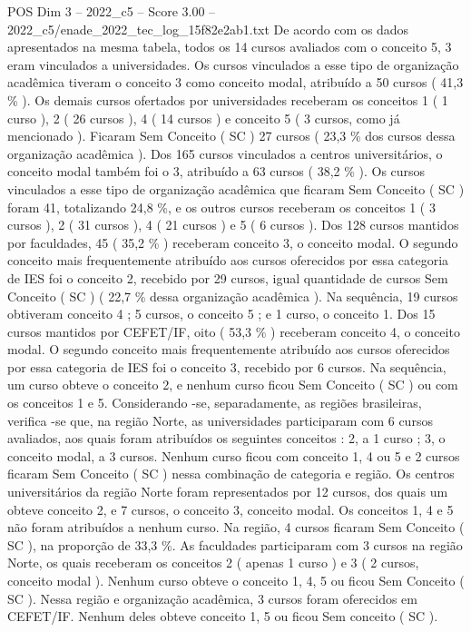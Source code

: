 \begin{textsample}{POS Dim 3 – 2022\_c5 – Score 3.00 – 2022\_c5/enade\_2022\_tec\_log\_15f82e2ab1.txt}
De acordo com os dados apresentados na mesma tabela, todos os 14 cursos avaliados com o conceito 5, 3 eram vinculados a universidades.
Os cursos vinculados a esse tipo de organização acadêmica tiveram o conceito 3 como conceito modal, atribuído a 50 cursos ( 41,3 \% ).
Os demais cursos ofertados por universidades receberam os conceitos 1 ( 1 curso ), 2 ( 26 cursos ), 4 ( 14 cursos ) e conceito 5 ( 3 cursos, como já mencionado ).
Ficaram Sem Conceito ( SC ) 27 cursos ( 23,3 \% dos cursos dessa organização acadêmica ).
Dos 165 cursos vinculados a centros universitários, o conceito modal também foi o 3, atribuído a 63 cursos ( 38,2 \% ).
Os cursos vinculados a esse tipo de organização acadêmica que ficaram Sem Conceito ( SC ) foram 41, totalizando 24,8 \%, e os outros cursos receberam os conceitos 1 ( 3 cursos ), 2 ( 31 cursos ), 4 ( 21 cursos ) e 5 ( 6 cursos ).
Dos 128 cursos mantidos por faculdades, 45 ( 35,2 \% ) receberam conceito 3, o conceito modal.
O segundo conceito mais frequentemente atribuído aos cursos oferecidos por essa categoria de IES foi o conceito 2, recebido por 29 cursos, igual quantidade de cursos Sem Conceito ( SC ) ( 22,7 \% dessa organização acadêmica ).
Na sequência, 19 cursos obtiveram conceito 4 ; 5 cursos, o conceito 5 ; e 1 curso, o conceito 1.
Dos 15 cursos mantidos por CEFET/IF, oito ( 53,3 \% ) receberam conceito 4, o conceito modal.
O segundo conceito mais frequentemente atribuído aos cursos oferecidos por essa categoria de IES foi o conceito 3, recebido por 6 cursos.
Na sequência, um curso obteve o conceito 2, e nenhum curso ficou Sem Conceito ( SC ) ou com os conceitos 1 e 5.
Considerando -se, separadamente, as regiões brasileiras, verifica -se que, na região Norte, as universidades participaram com 6 cursos avaliados, aos quais foram atribuídos os seguintes conceitos : 2, a 1 curso ; 3, o conceito modal, a 3 cursos.
Nenhum curso ficou com conceito 1, 4 ou 5 e 2 cursos ficaram Sem Conceito ( SC ) nessa combinação de categoria e região.
Os centros universitários da região Norte foram representados por 12 cursos, dos quais um obteve conceito 2, e 7 cursos, o conceito 3, conceito modal.
Os conceitos 1, 4 e 5 não foram atribuídos a nenhum curso.
Na região, 4 cursos ficaram Sem Conceito ( SC ), na proporção de 33,3 \%.
As faculdades participaram com 3 cursos na região Norte, os quais receberam os conceitos 2 ( apenas 1 curso ) e 3 ( 2 cursos, conceito modal ).
Nenhum curso obteve o conceito 1, 4, 5 ou ficou Sem Conceito ( SC ).
Nessa região e organização acadêmica, 3 cursos foram oferecidos em CEFET/IF.
Nenhum deles obteve conceito 1, 5 ou ficou Sem conceito ( SC ).

\end{textsample}
